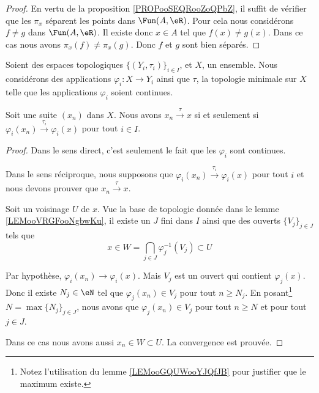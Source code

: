 \begin{proof}
	En vertu de la proposition \ref{PROPooSEQRooZoQPbZ}, il suffit de vérifier que les \( \pi_x\) séparent les points dans \( \Fun(A,\eR)\). Pour cela nous considérons \( f\neq g\) dans \( \Fun(A,\eR)\). Il existe donc \( x\in A\) tel que \( f(x)\neq g(x)\). Dans ce cas nous avons \( \pi_x(f)\neq \pi_x(g)\). Donc \( f\) et \( g\) sont bien séparés.
\end{proof}

\begin{lemma}     \label{LEMooADPLooYylNsj}
	Soient des espaces topologiques \( \{ (Y_i,\tau_i) \}_{i\in I}\), et \( X\), un ensemble. Nous considérons des applications \( \varphi_i\colon X\to Y_i\) ainsi que \( \tau\), la topologie minimale sur \( X\) telle que les applications \( \varphi_i\) soient continues.

	Soit une suite \( (x_n)\) dans \( X\). Nous avons \( x_n\stackrel{\tau}{\longrightarrow}x\) si et seulement si \( \varphi_i(x_n)\stackrel{\tau_i}{\longrightarrow}\varphi_i(x)\) pour tout \( i\in I\).
\end{lemma}

\begin{proof}
	Dans le sens direct, c'est seulement le fait que les \( \varphi_i\) sont continues.

	Dans le sens réciproque, nous supposons que \( \varphi_i(x_n)\stackrel{\tau_i}{\longrightarrow}\varphi_i(x)\) pour tout \( i\) et nous devons prouver que \( x_n\stackrel{\tau}{\longrightarrow}x\).

	Soit un voisinage \( U\) de \( x\). Vue la base de topologie donnée dans le lemme \ref{LEMooVRGFooNgbwKu}, il existe un \( J\) fini dans \( I\) ainsi que des ouverts \( \{ V_j \}_{j\in J}\) tels que
	\begin{equation}
		x\in W=\bigcap_{j\in J}\varphi_j^{-1}(V_j)\subset U
	\end{equation}

	Par hypothèse, \( \varphi_i(x_n)\to\varphi_i(x)\). Mais \( V_j\) est un ouvert qui contient \( \varphi_j(x)\). Donc il existe \( N_j\in \eN\) tel que \( \varphi_j(x_n)\in V_j\) pour tout \( n\geq N_j\). En posant\footnote{Notez l'utilisation du lemme \ref{LEMooGQUWooYJQfJB} pour justifier que le maximum existe.} \( N=\max\{ N_j \}_{j\in J}\), nous avons que \( \varphi_j(x_n)\in V_j\) pour tout \( n\geq N\) et pour tout \( j\in J\).

	Dans ce cas nous avons aussi \( x_n\in W\subset U\). La convergence est prouvée.
\end{proof}


